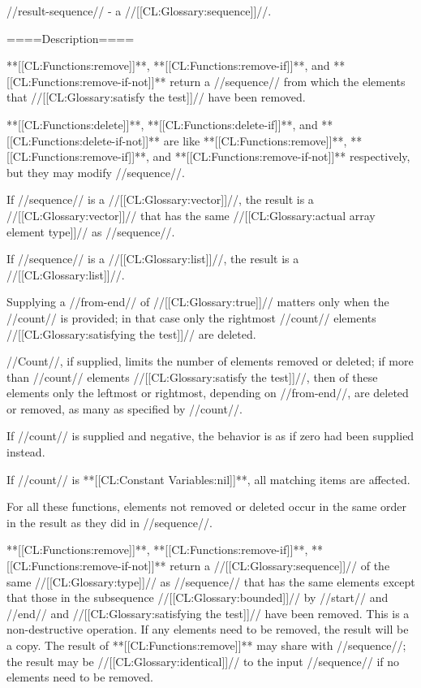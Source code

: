 //result-sequence// - a //[[CL:Glossary:sequence]]//.

====Description====

**[[CL:Functions:remove]]**, **[[CL:Functions:remove-if]]**, and **[[CL:Functions:remove-if-not]]** return a //sequence// from which the elements that //[[CL:Glossary:satisfy the test]]// have been removed.

**[[CL:Functions:delete]]**, **[[CL:Functions:delete-if]]**, and **[[CL:Functions:delete-if-not]]** are like **[[CL:Functions:remove]]**, **[[CL:Functions:remove-if]]**, and **[[CL:Functions:remove-if-not]]** respectively, but they may modify //sequence//.

If //sequence// is a //[[CL:Glossary:vector]]//, the result is a //[[CL:Glossary:vector]]// that has the same //[[CL:Glossary:actual array element type]]// as //sequence//.

If //sequence// is a //[[CL:Glossary:list]]//, the result is a //[[CL:Glossary:list]]//.

Supplying a //from-end// of //[[CL:Glossary:true]]// matters only when the //count// is provided; in that case only the rightmost //count// elements //[[CL:Glossary:satisfying the test]]// are deleted.

//Count//, if supplied, limits the number of elements removed or deleted; if more than //count// elements //[[CL:Glossary:satisfy the test]]//, then of these elements only the leftmost or rightmost, depending on //from-end//, are deleted or removed, as many as specified by //count//.

If //count// is supplied and negative, the behavior is as if zero had been supplied instead.

If //count// is **[[CL:Constant Variables:nil]]**, all matching items are affected.

For all these functions, elements not removed or deleted occur in the same order in the result as they did in //sequence//.

**[[CL:Functions:remove]]**, **[[CL:Functions:remove-if]]**, **[[CL:Functions:remove-if-not]]** return a //[[CL:Glossary:sequence]]// of the same //[[CL:Glossary:type]]// as //sequence// that has the same elements except that those in the subsequence //[[CL:Glossary:bounded]]// by //start// and //end// and //[[CL:Glossary:satisfying the test]]// have been removed. This is a non-destructive operation. If any elements need to be removed, the result will be a copy. The result of **[[CL:Functions:remove]]** may share with //sequence//; the result may be //[[CL:Glossary:identical]]// to the input //sequence// if no elements need to be removed.

